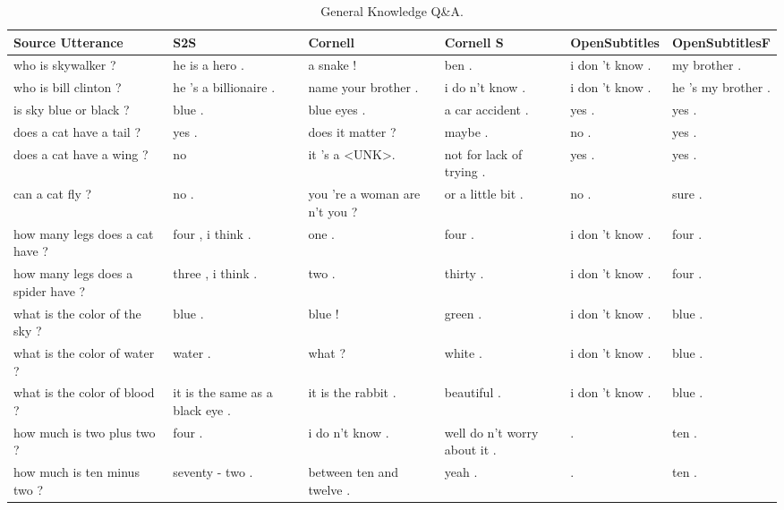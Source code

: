 \documentclass[12pt]{article}
\begin{document}
\begin{table}[H]
	\centering
	\begin{tabular}{|L{2.3cm}|L{2.3cm}|L{2.3cm}|L{2.3cm}|L{2.3cm}|L{2.3cm}|}
		\hline
		\textbf{Source Utterance} & \textbf{S2S} & \textbf{Cornell} & \textbf{Cornell S} & \textbf{OpenSubtitles} & \textbf{OpenSubtitlesF}\\ \hline
		who is skywalker ? & he is a hero . & a snake ! & ben . & i don 't know . & my brother . 
		\\ \hline
		who is bill clinton ? & he 's a billionaire . & name your brother . & i do n't know . & i don 't know . & he 's my brother . 
		\\ \hline
		is sky blue or black ? & blue . & blue eyes . & a car accident . & yes . & yes .
		\\ \hline
		does a cat have a tail ? & yes . & does it matter ?  & maybe . & no . & yes .
		\\ \hline
		does a cat have a wing ? & no & it 's a \textless UNK\textgreater . & not for lack of trying . & yes . & yes .
		\\ \hline
		can a cat fly ? & no . & you 're a woman are n't you ? & or a little bit . & no . & sure . 
		\\ \hline
		how many legs does a cat have ? & four , i think . & one .  & four . & i don 't know . & four .
		\\ \hline
		how many legs does a spider have ? & three , i think . & two . & thirty . & i don 't know . & four . 
		\\ \hline
		what is the color of the sky ? & blue . & blue !  & green . & i don 't know . & blue .
		\\ \hline
		what is the color of water ? & water . & what ? & white . & i don 't know . & blue .
		\\ \hline
		what is the color of blood ? & it is the same as a black eye . & it is the rabbit . & beautiful . & i don 't know . & blue .
		\\ \hline
		how much is two plus two ? & four . & i do n't know . & well do n't worry about it . & . & ten . 
		\\ \hline
		how much is ten minus two ? & seventy - two . & between ten and twelve .  & yeah . & . & ten . 
		\\ \hline
		
	\end{tabular}
	\caption{General Knowledge Q\&A.}	
	\label{table:genKnowledgeNCM}
\end{table}
\end{document}

